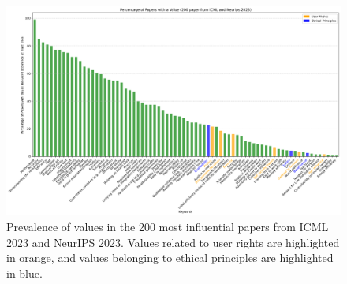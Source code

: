 \documentclass{article}
\begin{document}
\begin{figure}[H]
    \centering
    \includegraphics[width=\textwidth]{../plots/percentage_both_conferences.png}
    \caption{Prevalence of values in the 200 most influential papers from ICML 2023 and NeurIPS 2023. Values related to user rights are highlighted in orange, and values belonging to ethical principles are highlighted in blue.}
    \label{fig:percentage_both_conferences}
\end{figure}
\end{document}
